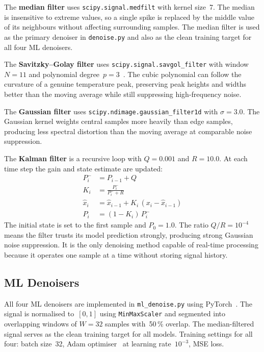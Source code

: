The \textbf{median filter} uses \texttt{scipy.signal.medfilt} with kernel
size~7. The median is insensitive to extreme values, so a single spike is replaced
by the middle value of its neighbours without affecting surrounding samples. The
median filter is used as the primary denoiser in \texttt{denoise.py} and also as
the clean training target for all four ML denoisers.

The \textbf{Savitzky--Golay filter} uses \texttt{scipy.signal.savgol\_filter}
with window~$N=11$ and polynomial degree~$p=3$~\cite{savitzky1964smoothing}. The
cubic polynomial can follow the curvature of a genuine temperature peak,
preserving peak heights and widths better than the moving average while still
suppressing high-frequency noise.

The \textbf{Gaussian filter} uses \texttt{scipy.ndimage.gaussian\_filter1d} with
$\sigma = 3.0$. The Gaussian kernel weights central samples more heavily than
edge samples, producing less spectral distortion than the moving average at
comparable noise suppression.

The \textbf{Kalman filter} is a recursive loop with $Q = 0.001$ and $R = 10.0$.
At each time step the gain and state estimate are updated:
\begin{align}
P_i^-     &= P_{i-1} + Q \\
K_i       &= \frac{P_i^-}{P_i^- + R} \\
\hat{x}_i &= \hat{x}_{i-1} + K_i\,(x_i - \hat{x}_{i-1}) \\
P_i       &= (1 - K_i)\,P_i^-
\end{align}
The initial state is set to the first sample and $P_0 = 1.0$. The ratio
$Q/R = 10^{-4}$ means the filter trusts its model prediction strongly, producing
strong Gaussian noise suppression. It is the only denoising method capable of
real-time processing because it operates one sample at a time without storing
signal history.

\subsection{ML Denoisers}

All four ML denoisers are implemented in \texttt{ml\_denoise.py} using
PyTorch~\cite{pytorch}. The signal is normalised to~$[0,1]$ using
\texttt{MinMaxScaler} and segmented into overlapping windows of $W=32$ samples
with~50\,\% overlap. The median-filtered signal serves as the clean training
target for all models. Training settings for all four: batch size~32, Adam
optimiser~\cite{kingma2014adam} at learning rate~$10^{-3}$, MSE loss.

